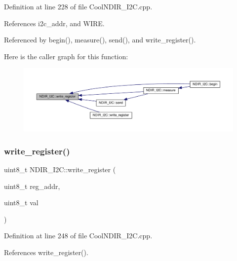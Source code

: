 Definition at line 228 of file Cool\+N\+D\+I\+R\+\_\+\+I2\+C.\+cpp.



References i2c\+\_\+addr, and W\+I\+RE.



Referenced by begin(), measure(), send(), and write\+\_\+register().

Here is the caller graph for this function\+:
\nopagebreak
\begin{figure}[H]
\begin{center}
\leavevmode
\includegraphics[width=350pt]{d6/ddb/class_n_d_i_r___i2_c_a5de6a044b00e985f035edca07521e319_icgraph}
\end{center}
\end{figure}
\mbox{\label{class_n_d_i_r___i2_c_a8ad2a76f9866b0a1f34810a147b4b20d}} 
\subsubsection{\texorpdfstring{write\+\_\+register()}{write\_register()}\hspace{0.1cm}{\footnotesize\ttfamily [2/2]}}
{\footnotesize\ttfamily uint8\+\_\+t N\+D\+I\+R\+\_\+\+I2\+C\+::write\+\_\+register (\begin{DoxyParamCaption}\item[{uint8\+\_\+t}]{reg\+\_\+addr,  }\item[{uint8\+\_\+t}]{val }\end{DoxyParamCaption})\hspace{0.3cm}{\ttfamily [private]}}



Definition at line 248 of file Cool\+N\+D\+I\+R\+\_\+\+I2\+C.\+cpp.



References write\+\_\+register().

